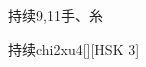 \begin{entry}{持续}{9,11}{⼿、⽷}
  \begin{phonetics}{持续}{chi2xu4}[][HSK 3]
  \end{phonetics}
\end{entry}
